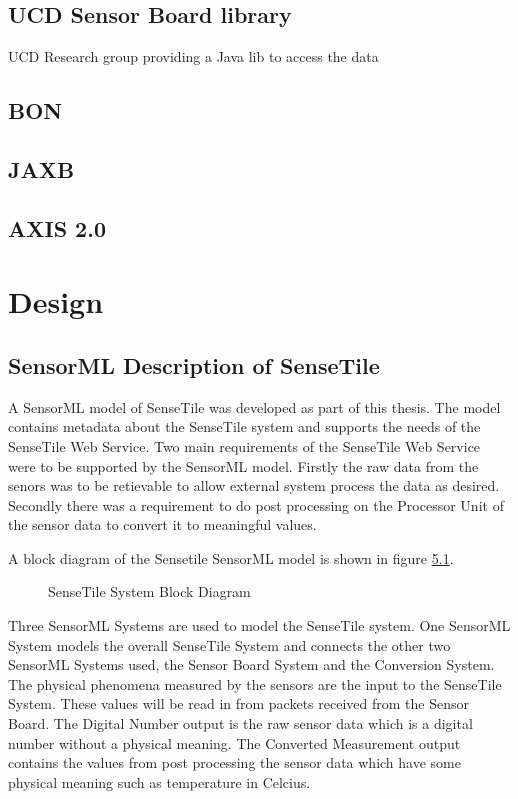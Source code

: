 \documentclass[]{final_report}
\begin{document}
\section{UCD Sensor Board library}
UCD Research group providing a Java lib to access the data 
\section{BON}
\section{JAXB}
\section{AXIS 2.0}


\chapter{Design}
\section{SensorML Description of SenseTile}

A SensorML model of SenseTile was developed as part of this thesis. The model contains metadata about the SenseTile system and supports the needs of the SenseTile Web Service. Two main requirements of the SenseTile Web Service were to be supported by the SensorML model. Firstly the raw data from the senors was to be retievable to allow external system process the data as desired. Secondly there was a requirement to do post processing on the Processor Unit of the sensor data to convert it to meaningful values.

A block diagram of the Sensetile SensorML model is shown in figure \ref{fig:SenseTileSystem}.
\begin{figure}[h]
\caption{SenseTile System Block Diagram}\label{fig:SenseTileSystem}
\end{figure}

Three SensorML Systems are used to model the SenseTile system. One SensorML System models the overall SenseTile System and connects the other two SensorML Systems used, the Sensor Board System and the Conversion System. The physical phenomena measured by the sensors are the input to the  SenseTile System. These values will be read in from packets received from the Sensor Board. The Digital Number output is the raw sensor data which is a digital number without a physical meaning. The Converted Measurement output contains the values from post processing the sensor data which have some physical meaning such as temperature in Celcius.
\end{document}
